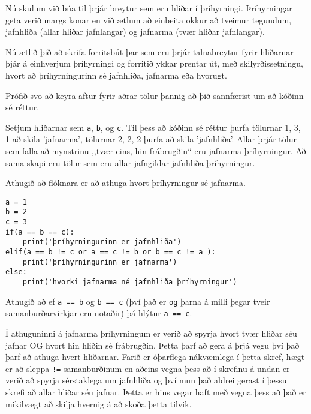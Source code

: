 \begin{exercise}\label{exp4}
Nú skulum við búa til þrjár breytur sem eru hliðar í þríhyrningi.
Þríhyrningar geta verið margs konar en við ætlum að einbeita okkur að tveimur tegundum, jafnhliða (allar hliðar jafnlangar) og jafnarma (tvær hliðar jafnlangar).

Nú ætlið þið að skrifa forritsbút þar sem eru þrjár talnabreytur fyrir hliðarnar þjár á einhverjum þríhyrningi og forritið ykkar prentar út, með skilyrðissetningu, hvort að þríhyrningurinn sé jafnhliða, jafnarma eða hvorugt.

Prófið svo að keyra aftur fyrir aðrar tölur þannig að þið sannfærist um að kóðinn sé réttur.
\end{exercise}
\begin{Answer}[ref={exp4}]
Setjum hliðarnar sem \texttt{a}, \texttt{b}, og \texttt{c}.
Til þess að kóðinn sé réttur þurfa tölurnar 1, 3, 1 að skila 'jafnarma', tölurnar 2, 2, 2 þurfa að skila 'jafnhliða'.
Allar þrjár tölur sem falla að mynstrinu ,,tvær eins, hin frábrugðin“ eru jafnarma þríhyrningur.
Að sama skapi eru tölur sem eru allar jafngildar jafnhliða þríhyrningur.

Athugið að flóknara er að athuga hvort þríhyrningur sé jafnarma.
	\begin{lstlisting}
a = 1
b = 2
c = 3
if(a == b == c):
	print('þríhyrningurinn er jafnhliða')
elif(a == b != c or a == c != b or b == c != a ):
	print('þríhyrningurinn er jafnarma')
else:
	print('hvorki jafnarma né jafnhliða þríhyrningur')\end{lstlisting}

Athugið að ef \texttt{a == b} og \texttt{b == c} (því það er \texttt{og} þarna á milli þegar tveir samanburðarvirkjar eru notaðir) þá hlýtur \texttt{a == c}.

Í athuguninni á jafnarma þríhyrningum er verið að spyrja hvort tvær hliðar séu jafnar OG hvort hin hliðin sé frábrugðin.
Þetta þarf að gera á þrjá vegu því það þarf að athuga hvert hliðarnar.
Farið er óþarflega nákvæmlega í þetta skref, hægt er að sleppa \texttt{!=} samanburðinum en aðeins vegna þess að í skrefinu á undan er verið að spyrja sérstaklega um jafnhliða og því mun það aldrei gerast í þessu skrefi að allar hliðar séu jafnar.
Þetta er hins vegar haft með vegna þess að það er mikilvægt að skilja hvernig á að skoða þetta tilvik.
\end{Answer}

